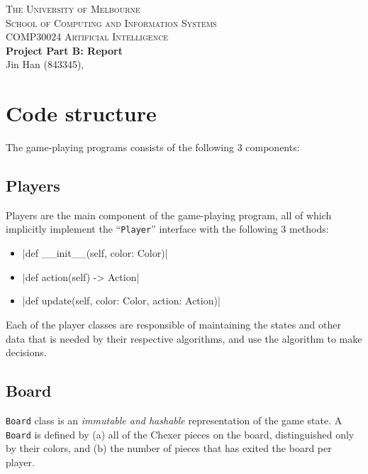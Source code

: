 \documentclass[12pt,a4paper]{article}
\begin{document}
\begin{center}
    \textsc{The University of Melbourne\\
    School of Computing and Information Systems\\
    COMP30024 Artificial Intelligence}\\
    \vspace{1em}
    \textbf{\Large Project Part B: Report}\\
    \vspace{1em}
    Jin Han (843345), 
    \footnotemark
\end{center}


\section{Code structure}

The game-playing programs consists of the following 3 components:

\subsection{Players}
  Players are the main component of the game-playing program,
all of which implicitly implement the ``\texttt{Player}'' interface with
the following 3 methods:
\begin{itemize}
    \item {}|def __init__(self, color: Color)|
    \item {}|def action(self) -> Action|
    \item {}|def update(self, color: Color, action: Action)|
\end{itemize}
Each of the player classes are responsible of maintaining the states and other
data that is needed by their respective algorithms, and use the algorithm to
make decisions.

\subsection{Board} \label{board}
\texttt{Board} class is an \textit{immutable and hashable} 
representation of the game state. A \texttt{Board} is defined by (a) all of 
the Chexer pieces on the board, distinguished only by their colors, and (b) 
the number of pieces that has exited the board per player.
\end{document}
